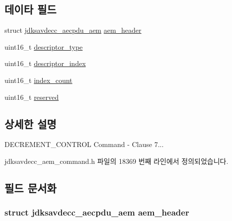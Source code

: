 \subsection*{데이타 필드}
\begin{DoxyCompactItemize}
\item 
struct \hyperlink{structjdksavdecc__aecpdu__aem}{jdksavdecc\+\_\+aecpdu\+\_\+aem} \hyperlink{structjdksavdecc__aem__command__decrement__control_ae1e77ccb75ff5021ad923221eab38294}{aem\+\_\+header}
\item 
uint16\+\_\+t \hyperlink{structjdksavdecc__aem__command__decrement__control_ab7c32b6c7131c13d4ea3b7ee2f09b78d}{descriptor\+\_\+type}
\item 
uint16\+\_\+t \hyperlink{structjdksavdecc__aem__command__decrement__control_a042bbc76d835b82d27c1932431ee38d4}{descriptor\+\_\+index}
\item 
uint16\+\_\+t \hyperlink{structjdksavdecc__aem__command__decrement__control_a07c424faad8558baa0910454cb2d463b}{index\+\_\+count}
\item 
uint16\+\_\+t \hyperlink{structjdksavdecc__aem__command__decrement__control_a5a6ed8c04a3db86066924b1a1bf4dad3}{reserved}
\end{DoxyCompactItemize}


\subsection{상세한 설명}
D\+E\+C\+R\+E\+M\+E\+N\+T\+\_\+\+C\+O\+N\+T\+R\+OL Command -\/ Clause 7... 

jdksavdecc\+\_\+aem\+\_\+command.\+h 파일의 18369 번째 라인에서 정의되었습니다.



\subsection{필드 문서화}
\subsubsection[{\texorpdfstring{aem\+\_\+header}{aem_header}}]{\setlength{\rightskip}{0pt plus 5cm}struct {\bf jdksavdecc\+\_\+aecpdu\+\_\+aem} aem\+\_\+header}\hypertarget{structjdksavdecc__aem__command__decrement__control_ae1e77ccb75ff5021ad923221eab38294}{}\label{structjdksavdecc__aem__command__decrement__control_ae1e77ccb75ff5021ad923221eab38294}


